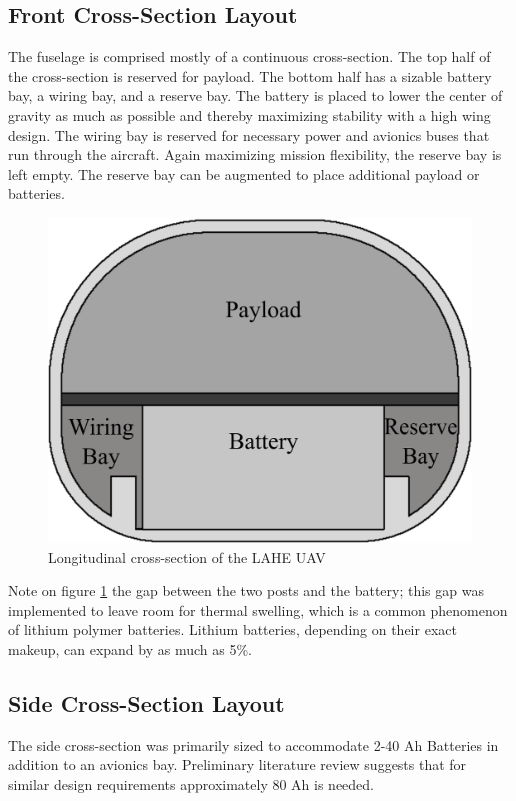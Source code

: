 \documentclass[12pt]{article}
\begin{document}
	\subsection{Front Cross-Section Layout}
	The fuselage is comprised mostly of a continuous cross-section. The top half of the cross-section is reserved for payload. The bottom half has a sizable battery bay, a wiring bay, and a reserve bay. The battery is placed to lower the center of gravity as much as possible and thereby maximizing stability with a high wing design. The wiring bay is reserved for necessary power and avionics buses that run through the aircraft. Again maximizing mission flexibility, the reserve bay is left empty. The reserve bay can be augmented to place additional payload or batteries. 
	\begin{figure}[h!]
		\centering
		\includegraphics[width=6 in]{Media/FrontCrossSection.png} %
		\caption{Longitudinal cross-section of the LAHE UAV}
		\label{fig:front_cross_section}
	\end{figure}
	
	Note on figure \ref{fig:front_cross_section} the gap between the two posts and the battery; this gap was implemented to leave room for thermal swelling, which is a common phenomenon of lithium polymer batteries. Lithium batteries, depending on their exact makeup, can expand by as much as 5\%. 
	
	\subsection{Side Cross-Section Layout}
	The side cross-section was primarily sized to accommodate 2-40 Ah Batteries in addition to an avionics bay. Preliminary literature review suggests that for similar design requirements approximately 80 Ah is needed.
	
\end{document}
